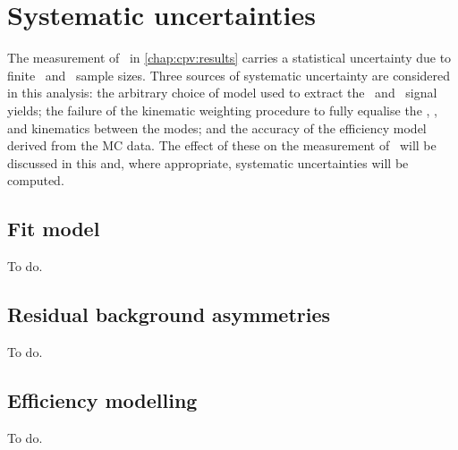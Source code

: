 \chapter{Systematic uncertainties}
\label{chap:cpv:syst}

The measurement of \dACP\ in \cref{chap:cpv:results} carries a statistical 
uncertainty due to finite \pKK\ and \ppipi\ sample sizes.
Three sources of systematic uncertainty are considered in this analysis: the 
arbitrary choice of model used to extract the \PLambdac\ and \APLambdac\ signal 
yields; the failure of the kinematic weighting procedure to fully equalise the 
\PLambdab, \Pmuon, and \Pproton kinematics between the modes; and the accuracy 
of the efficiency model derived from the \ac{MC} data.
The effect of these on the measurement of \dACP\ will be discussed in this 
 and, where appropriate, systematic uncertainties will 
be computed.

\section{Fit model}
\label{chap:cpv:syst:fit}

To do.

\section{Residual background asymmetries}
\label{chap:cpv:syst:asym}

To do.

\section{Efficiency modelling}
\label{chap:cpv:syst:eff}

To do.
